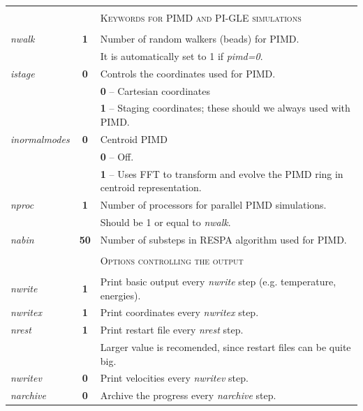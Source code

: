 \begin{tabularx}{\textwidth}{lcX}
& & \\
& & \textsc{Keywords for PIMD and PI-GLE simulations} \\
& & \\

\textit{nwalk} & \textbf{1} & Number of random walkers (beads) for PIMD. \\
 & & It is automatically set to 1 if \textit{pimd=0}. \\
 
\textit{istage}  & \textbf{0} & Controls the coordinates used for PIMD.\\
 & & \textbf{0} -- Cartesian coordinates \\
 & & \textbf{1} -- Staging coordinates; these should we always used with PIMD. \\
 
\textit{inormalmodes} & \textbf{0} & Centroid PIMD \\
 & & \textbf{0} -- Off. \\
 & & \textbf{1} -- Uses FFT to transform and evolve the PIMD ring in centroid representation.\\

\textit{nproc} & \textbf{1} & Number of processors for parallel PIMD simulations. \\
& & Should be 1 or equal to \textit{nwalk}. 	 \\
\colorbox{black!20}{\textit{nabin}} & \textbf{50} & Number of substeps in RESPA algorithm used for PIMD. \\

& & \\
& & \textsc{Options controlling the output} \\
& & \\

\textit{nwrite} & \textbf{1}  & Print basic output every \textit{nwrite} step (e.g. temperature, energies).  \\
\textit{nwritex}& \textbf{1}  & Print coordinates every  \textit{nwritex} step. \\
\textit{nrest} & \textbf{1}   & Print restart file every \textit{nrest} step.   \\
& &  Larger value is recomended, since restart files can be quite big. \\
\textit{nwritev} & \textbf{0} & Print velocities every \textit{nwritev} step.   \\
\textit{narchive} & \textbf{0} & Archive the progress every \textit{narchive} step.   \\

\end{tabularx}
\newpage

